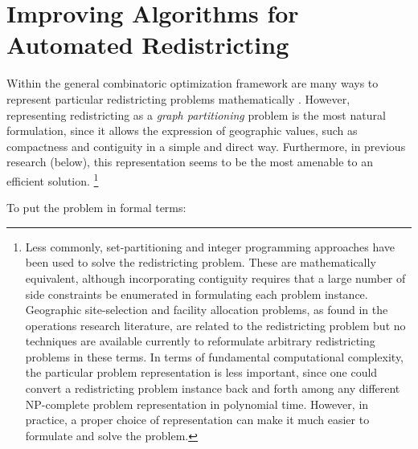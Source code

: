 \documentclass[article]{JSSstyle/jss}
\begin{document}
\section{Improving Algorithms for Automated Redistricting} 

Within the general combinatoric optimization framework are many 
ways to represent particular redistricting problems 
mathematically \citep[see][]{Altman97}. However, representing 
redistricting as a \emph{graph partitioning} problem is the most 
natural formulation, since it allows the expression of geographic 
values, such as compactness and contiguity in a simple and direct 
way. Furthermore, in previous research (below), this representation 
seems to be the most amenable to an efficient solution. 
\footnote{Less commonly, set-partitioning and integer programming 
approaches have been used to solve the redistricting problem. These 
are mathematically equivalent, although incorporating contiguity 
requires that a large number of side constraints be enumerated in 
formulating each problem instance. Geographic site-selection and 
facility allocation problems, as found in the operations research 
literature, are related to the redistricting problem but no 
techniques are available currently to reformulate arbitrary 
redistricting problems in these terms.  In terms of fundamental 
computational complexity, the particular problem representation is 
less important, since one could convert a redistricting problem 
instance back and forth among any different NP-complete problem 
representation in polynomial time. However, in practice, a proper 
choice of representation can make it much easier to formulate and 
solve the problem.}  

To put the problem in formal terms:

\end{document}
